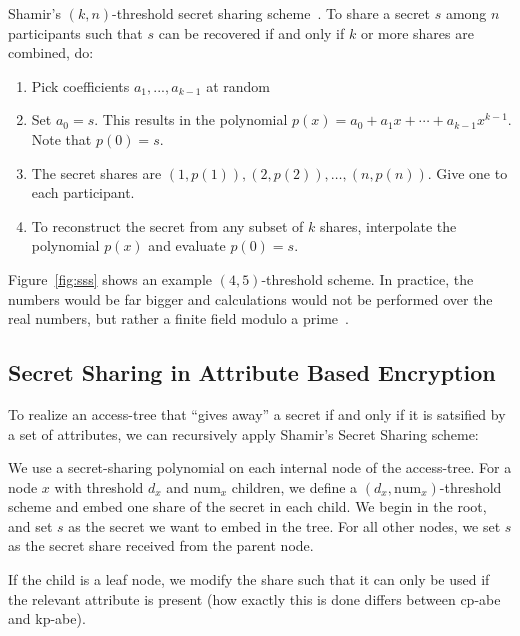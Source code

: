 

\begin{definition}
    Shamir's $(k, n)$-threshold secret sharing scheme~\cite{shamir_how_1979}.
    To share a secret $s$ among $n$ participants such that $s$ can be recovered if and only if $k$ or more shares are combined, do:
    \begin{enumerate}
        \item Pick coefficients $a_1, ..., a_{k-1}$ at random 
        \item Set $a_0 = s$. This results in the polynomial $p(x) = a_0 + a_1x + \cdots + a_{k-1}x^{k-1}$. Note that $p(0) = s$.
        \item The secret shares are $(1, p(1)), (2, p(2)), \dots, (n, p(n))$. Give one to each participant.
        \item To reconstruct the secret from any subset of $k$ shares, interpolate the polynomial $p(x)$ and evaluate $p(0) = s$. 
    \end{enumerate}
\end{definition}

Figure~\ref{fig:sss} shows an example $(4,5)$-threshold scheme.
In practice, the numbers would be far bigger and calculations would not be performed over the real numbers, but rather a finite field modulo a prime~\cite{shamir_how_1979}.

\subsection{Secret Sharing in Attribute Based Encryption}\label{sec:lss-in-access-trees}
To realize an \gls{access-tree} that ``gives away'' a secret if and only if it is satsified by a set of attributes, we can recursively apply Shamir's Secret Sharing scheme:



We use a secret-sharing polynomial on each internal node of the \gls{access-tree}.
For a node $x$ with threshold $d_x$ and $\text{num}_x$ children, we define a $(d_x, \text{num}_x)$-threshold scheme and embed one share of the secret in each child.
We begin in the root, and set $s$ as the secret we want to embed in the tree.
For all other nodes, we set $s$ as the secret share received from the parent node.

If the child is a leaf node, we modify the share such that it can only be used if the relevant attribute is present (how exactly this is done differs between \acrshort{cp-abe} and \acrshort{kp-abe}).

